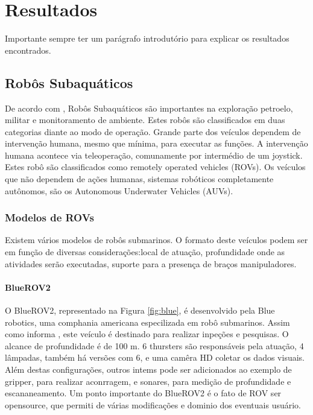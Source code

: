 \chapter{Resultados}
\label{chap:result}
Importante sempre ter um parágrafo introdutório para explicar os resultados encontrados.

\section{Robôs Subaquáticos}

\label{underwater_robots}

De acordo com \cite{Bogue1}, Robôs Subaquáticos são importantes na exploração petroelo, militar e monitoramento de ambiente. Estes robôs são classificados em duas categorias diante ao modo de operação. Grande parte dos veículos dependem de intervenção humana, mesmo que mínima, para executar as funções.
A intervenção humana  acontece via teleoperação, comunamente por intermédio de um joystick. Estes robô são classificados como remotely operated vehicles (ROVs). Os veículos que não dependem de ações humanas, sistemas robóticos completamente autônomos, são os   Autonomous Underwater Vehicles (AUVs).

\subsection{Modelos de ROVs}

Existem vários modelos de robôs submarinos. O formato deste veículos podem ser em função de diversas considerações:local de atuação, profundidade onde as atividades serão executadas, suporte para a presença de braços manipuladores.

\subsubsection{BlueROV2}


O BlueROV2, representado na Figura \ref{fig:blue}, é desenvolvido pela Blue robotics, uma comphania americana especilizada em robô submarinos. Assim como informa \cite{Bluerobotics}, este veículo é destinado para realizar inpeções e pesquisas. O alcance de profundidade é de 100 m. 6 thursters são responsáveis pela atuação, 4 lâmpadas, também há versões com 6, e uma camêra HD coletar os dados visuais. 
Além destas configurações, outros intems pode ser adicionados ao exemplo de gripper, para realizar aconrragem, e sonares, para medição de profundidade e escananeamento. Um ponto importante do BlueROV2 é o fato de ROV ser opensource,  que permiti de várias modificações e dominio dos eventuais usuário.

